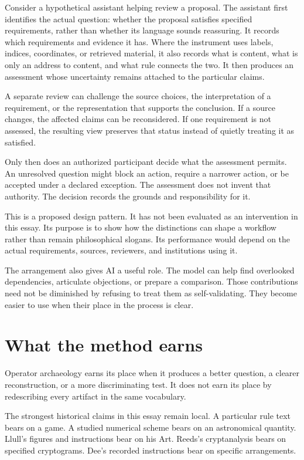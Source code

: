 \documentclass[11pt]{article}
\begin{document}
Consider a hypothetical assistant helping review a proposal. The assistant
first identifies the actual question: whether the proposal satisfies specified
requirements, rather than whether its language sounds reassuring. It records
which requirements and evidence it has. Where the instrument uses labels,
indices, coordinates, or retrieved material, it also records what is content,
what is only an address to content, and what rule connects the two. It then
produces an assessment whose uncertainty remains attached to the particular
claims.

A separate review can challenge the source choices, the interpretation of a
requirement, or the representation that supports the conclusion. If a source
changes, the affected claims can be reconsidered. If one requirement is not
assessed, the resulting view preserves that status instead of quietly treating
it as satisfied.

Only then does an authorized participant decide what the assessment permits.
An unresolved question might block an action, require a narrower action,
or be accepted under a declared exception. The assessment does not invent
that authority. The decision records the grounds and responsibility for it.

This is a proposed design pattern. It has not been evaluated as an intervention
in this essay. Its purpose is to show how the distinctions can shape a workflow
rather than remain philosophical slogans. Its performance would depend on
the actual requirements, sources, reviewers, and institutions using it.

The arrangement also gives AI a useful role. The model can help find overlooked
dependencies, articulate objections, or prepare a comparison. Those
contributions need not be diminished by refusing to treat them as self-validating.
They become easier to use when their place in the process is clear.

\section{What the method earns}

Operator archaeology earns its place when it produces a better question,
a clearer reconstruction, or a more discriminating test. It does not earn
its place by redescribing every artifact in the same vocabulary.

The strongest historical claims in this essay remain local. A particular
rule text bears on a game. A studied numerical scheme bears on an astronomical
quantity. Llull's figures and instructions bear on his Art. Reeds's
cryptanalysis bears on specified cryptograms. Dee's recorded instructions
bear on specific arrangements.
\end{document}
